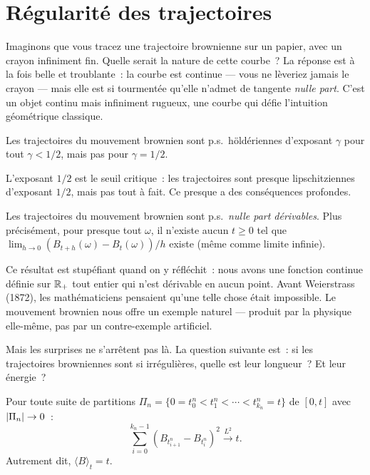 \section{R\'egularit\'e des trajectoires}

Imaginons que vous tracez une trajectoire brownienne sur un papier, avec un
crayon infiniment fin. Quelle serait la nature de cette courbe~? La r\'eponse
est \`a la fois belle et troublante~: la courbe est continue --- vous ne
l\`everiez jamais le crayon --- mais elle est si tourment\'ee qu'elle n'admet
de tangente \emph{nulle part}. C'est un objet continu mais infiniment
rugueux, une courbe qui d\'efie l'intuition g\'eom\'etrique classique.

\begin{theoreme}
\label{thm:holder}
Les trajectoires du mouvement brownien sont p.s.\ h\"old\'eriennes d'exposant
$\gamma$ pour tout $\gamma < 1/2$, mais pas pour $\gamma = 1/2$.
\end{theoreme}

L'exposant $1/2$ est le seuil critique~: les trajectoires sont
\og presque\fg{} lipschitziennes d'exposant $1/2$, mais pas tout \`a fait. Ce
\og presque\fg{} a des cons\'equences profondes.

\begin{theoreme}
\label{thm:non_deriv}
Les trajectoires du mouvement brownien sont p.s.\ \emph{nulle part d\'erivables}.
Plus pr\'ecis\'ement, pour presque tout $\omega$, il n'existe aucun $t \geq 0$ tel que
$\lim_{h \to 0} (B_{t+h}(\omega) - B_t(\omega))/h$ existe (m\^eme comme limite
infinie).
\end{theoreme}

Ce r\'esultat est stup\'efiant quand on y r\'efl\'echit~: nous avons une fonction
continue d\'efinie sur $\mathbb{R}_+$ tout entier qui n'est d\'erivable en aucun point.
Avant Weierstrass (1872), les math\'ematiciens pensaient qu'une telle chose
\'etait impossible. Le mouvement brownien nous offre un exemple
\og naturel\fg{} --- produit par la physique elle-m\^eme, pas par un
contre-exemple artificiel.

Mais les surprises ne s'arr\^etent pas l\`a. La question suivante est~: si les
trajectoires browniennes sont si irr\'eguli\`eres, quelle est leur
\og longueur\fg{}~? Et leur \og \'energie\fg{}~?

\begin{theoreme}
\label{thm:var_quad_brown}
Pour toute suite de partitions $\Pi_n = \{0 = t_0^n < t_1^n < \cdots < t_{k_n}^n = t\}$
de $[0, t]$ avec $\left| \Pi_n \right| \to 0$~:
\[
  \sum_{i=0}^{k_n - 1} (B_{t_{i+1}^n} - B_{t_i^n})^2 \xrightarrow{L^2} t.
\]
Autrement dit, $\langle B \rangle_t = t$.
\end{theoreme}

